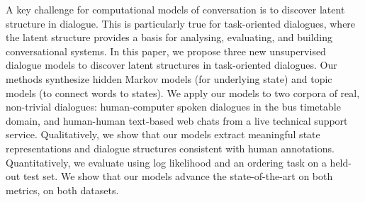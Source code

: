 A key challenge for computational models of conversation is to discover latent structure in dialogue. This is particularly true for task-oriented dialogues, where the latent structure provides a basis for analysing, evaluating, and building conversational systems. In this paper, we propose three new unsupervised dialogue models to discover latent structures in task-oriented dialogues. Our methods synthesize hidden Markov models (for underlying state) and topic models (to connect words to states). We apply our models to two corpora of real, non-trivial dialogues: human-computer spoken dialogues in the bus timetable domain, and human-human text-based web chats from a live technical support service. Qualitatively, we show that our models extract meaningful state representations and dialogue structures consistent with human annotations. Quantitatively, we evaluate using log likelihood and an ordering task on a held-out test set. We show that our models advance the state-of-the-art on both metrics, on both datasets.
